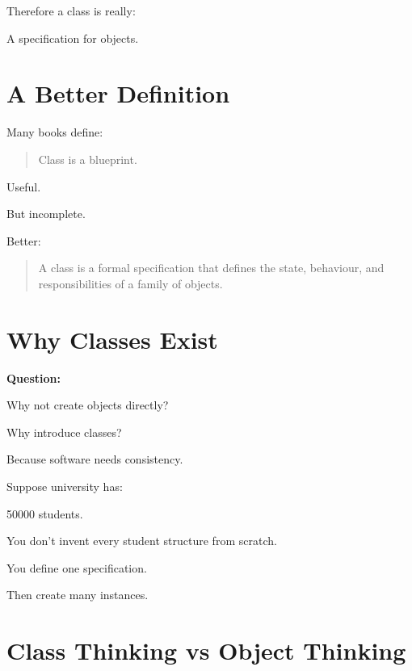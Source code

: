 \documentclass[11pt,a4paper]{book}
\begin{document}
Therefore a class is really:

\begin{center}
A specification for objects.
\end{center}


\section{A Better Definition}

Many books define:

\begin{quote}
Class is a blueprint.
\end{quote}

Useful.

But incomplete.

Better:

\begin{quote}
A class is a formal specification that defines
the state, behaviour, and responsibilities
of a family of objects.
\end{quote}


\section{Why Classes Exist}

\textbf{Question:}

Why not create objects directly?

Why introduce classes?

\begin{idea}

Because software needs consistency.

\end{idea}

Suppose university has:

50000 students.

You don't invent every student structure from scratch.

You define one specification.

Then create many instances.


\section{Class Thinking vs Object Thinking}
\end{document}
